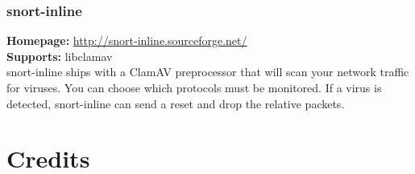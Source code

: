 \documentclass[a4paper,titlepage,12pt]{article}
\begin{document}
    \subsubsection{snort-inline}
    \textbf{Homepage:} \url{http://snort-inline.sourceforge.net/}\\
    \textbf{Supports:} libclamav\\[4pt]
    snort-inline ships with a ClamAV preprocessor that will scan your network
    traffic for viruses. You can choose which protocols must be monitored. If
    a virus is detected, snort-inline can send a reset and drop the relative
    packets.

    \section{Credits}
\end{document}
